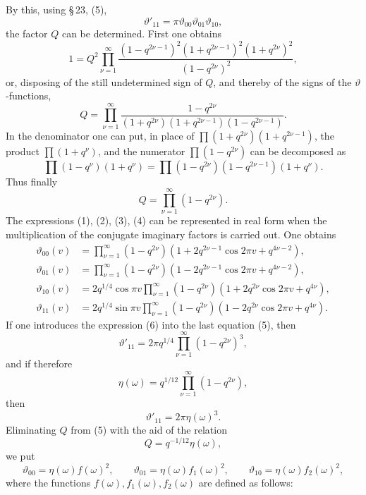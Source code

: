 \documentclass[11pt]{article}
\newcommand{\tht}{\vartheta}
\begin{document}
By this, using \S\,23, (5),
\[
\tht'_{11}=\pi\tht_{00}\tht_{01}\tht_{10},
\]
the factor $Q$ can be determined. First one obtains
\[
1=Q^2\prod_{\nu=1}^{\infty}\frac{(1-q^{2\nu-1})^2(1+q^{2\nu-1})^2(1+q^{2\nu})^2}{(1-q^{2\nu})^2},
\]
or, disposing of the still undetermined sign of $Q$, and thereby of the signs of the $\vartheta$-functions,
\[
Q=\prod_{\nu=1}^{\infty}\frac{1-q^{2\nu}}{(1+q^{2\nu})(1+q^{2\nu-1})(1-q^{2\nu-1})}.
\]
In the denominator one can put, in place of $\prod(1+q^{2\nu})(1+q^{2\nu-1})$, the product $\prod(1+q^{\nu})$, and the numerator $\prod(1-q^{2\nu})$ can be decomposed as
\[
\prod(1-q^{\nu})(1+q^{\nu})=\prod(1-q^{2\nu})(1-q^{2\nu-1})(1+q^{\nu}).
\]
Thus finally
\begin{equation}
Q=\prod_{\nu=1}^{\infty}(1-q^{2\nu}).
\tag{6}
\end{equation}
The expressions (1), (2), (3), (4) can be represented in real form when the multiplication of the conjugate imaginary factors is carried out. One obtains
\begin{equation}
\begin{aligned}
\tht_{00}(v)&=\prod_{\nu=1}^{\infty}(1-q^{2\nu})(1+2q^{2\nu-1}\cos2\pi v+q^{4\nu-2}),\\
\tht_{01}(v)&=\prod_{\nu=1}^{\infty}(1-q^{2\nu})(1-2q^{2\nu-1}\cos2\pi v+q^{4\nu-2}),\\
\tht_{10}(v)&=2q^{1/4}\cos\pi v\prod_{\nu=1}^{\infty}(1-q^{2\nu})(1+2q^{2\nu}\cos2\pi v+q^{4\nu}),\\
\tht_{11}(v)&=2q^{1/4}\sin\pi v\prod_{\nu=1}^{\infty}(1-q^{2\nu})(1-2q^{2\nu}\cos2\pi v+q^{4\nu}).
\end{aligned}
\tag{7}
\end{equation}
If one introduces the expression (6) into the last equation (5), then
\[
\tht'_{11}=2\pi q^{1/4}\prod_{\nu=1}^{\infty}(1-q^{2\nu})^3,
\]
and if therefore
\begin{equation}
\eta(\omega)=q^{1/12}\prod_{\nu=1}^{\infty}(1-q^{2\nu}),
\tag{8}
\end{equation}
then
\begin{equation}
\tht'_{11}=2\pi\eta(\omega)^3.
\tag{9}
\end{equation}
Eliminating $Q$ from (5) with the aid of the relation
\[
Q=q^{-1/12}\eta(\omega),
\]
we put
\begin{equation}
\tht_{00}=\eta(\omega)f(\omega)^2,
\qquad
\tht_{01}=\eta(\omega)f_1(\omega)^2,
\qquad
\tht_{10}=\eta(\omega)f_2(\omega)^2,
\tag{10}
\end{equation}
where the functions $f(\omega),f_1(\omega),f_2(\omega)$ are defined as follows:
\end{document}
